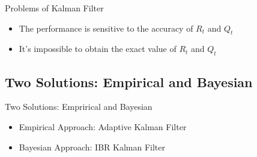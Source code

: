 \begin{frame}{Problems of Kalman Filter}
\begin{itemize}
    \item The performance is sensitive to the accuracy of $R_t$ and $Q_t$
    \item It's impossible to obtain the exact value of $R_t$ and $Q_t$
\end{itemize}
\end{frame}

\subsection{Two Solutions: Empirical and Bayesian}

\begin{frame}{Two Solutions: Emprirical and Bayesian}
\begin{itemize}
    \item Empirical Approach: Adaptive Kalman Filter
    \item Bayesian Approach: IBR Kalman Filter
\end{itemize}    
\end{frame}